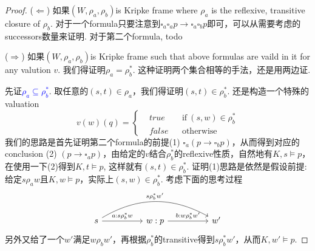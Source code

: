 \documentclass{article}
\theoremstyle{plain}
\theoremstyle{nonumberplain}
\newtheorem{proof}{Proof}
\newcommand{\bluet}[1]{\textcolor{blue}{#1}}
\begin{document}
\begin{proof}
\rm ($\Leftarrow$) 如果$(W, \rho_a, \rho_b)$is Kripke frame where $\rho_a$ is the reflexive, transitive closure of $\rho_b$. 对于一个formula只要注意到$\square_a\square_a p \to \square_a\square_b p$即可，可以从需要考虑的successors数量来证明. 对于第二个formula, todo


($\Rightarrow$) 如果$(W, \rho_a, \rho_b)$is Kripke frame such that above formulas are vaild in it for any valution $v$. 我们得证明$\rho_a = \rho_b^*$. 这种证明两个集合相等的手法，还是用两边证.

先证\bluet{$\rho_a \subseteq \rho_b^*$}. 取任意的$(s,t) \in \rho_a$，我们得证明$(s,t) \in \rho_b^*$. 还是构造一个特殊的valuation
$$
v(w)(q) = \left\{
\begin{aligned}
&true && \text{if}~(s,w) \in \rho_b^* \\
&false && \text{otherwise}
\end{aligned}
\right.
$$
我们的思路是首先证明第二个formula的前提(1) $\square_a(p \to \square_b p)$，从而得到对应的conclusion (2) $(p \to \square_a p)$，由给定的$v$结合$\rho_b^*$的reflexive性质，自然地有$K,s \vDash p$，在使用一下(2)得到$K,t \vDash p$, 这样就有$(s,t) \in \rho_b^*$.  证明(1)思路是依然是假设前提: 给定$s \rho_a w$且$K,w \vDash p$，实际上$(s,w) \in \rho_b^*$. 考虑下面的思考过程
$$
\begin{tikzcd}
s \arrow[rr, "a: s \rho_b^* w"] \arrow[rrrr, "s \rho_b^* w'", bend left] &  & w: p \arrow[rr, "b: w\rho_b^*w'"] &  & w'
\end{tikzcd}
$$
另外又给了一个$w'$满足$w \rho_b w'$，再根据$\rho_b^*$的transitive得到$s \rho_b^* w'$，从而$K,w' \vDash p$. 


\end{proof}
\end{document}
